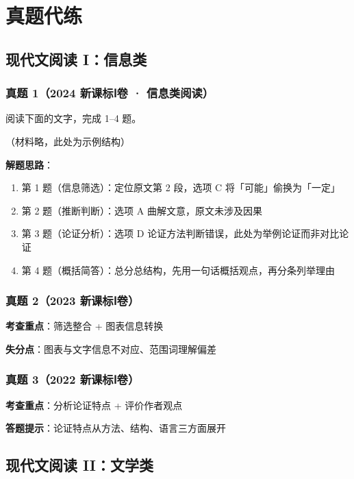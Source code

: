 \section{真题代练}

\subsection{现代文阅读 I：信息类}

\subsubsection{真题 1（2024 新课标Ⅰ卷 · 信息类阅读）}

阅读下面的文字，完成 1--4 题。

（材料略，此处为示例结构）

\textbf{解题思路}：

\begin{enumerate}
  \item 第 1 题（信息筛选）：定位原文第 2 段，选项 C 将「可能」偷换为「一定」
  \item 第 2 题（推断判断）：选项 A 曲解文意，原文未涉及因果
  \item 第 3 题（论证分析）：选项 D 论证方法判断错误，此处为举例论证而非对比论证
  \item 第 4 题（概括简答）：总分总结构，先用一句话概括观点，再分条列举理由
\end{enumerate}

\subsubsection{真题 2（2023 新课标Ⅰ卷）}

\textbf{考查重点}：筛选整合 + 图表信息转换

\textbf{失分点}：图表与文字信息不对应、范围词理解偏差

\subsubsection{真题 3（2022 新课标Ⅰ卷）}

\textbf{考查重点}：分析论证特点 + 评价作者观点

\textbf{答题提示}：论证特点从方法、结构、语言三方面展开

\subsection{现代文阅读 II：文学类}

